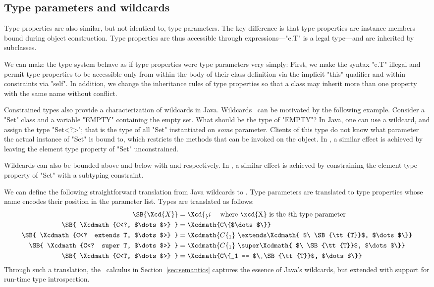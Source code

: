 \subsection{Type parameters and wildcards}
\label{sec:parameters-vs-fields}

Type properties are also similar, but not identical to, type
parameters.  The key difference is that type properties are
instance members bound during object construction.  Type
properties are thus accessible through expressions---\xcd"e.T" is
a legal type---and are inherited by subclasses.

We can make the type system behave as if type properties were
type parameters very simply:  First, we make the syntax \xcd"e.T"
illegal and permit type properties to be accessible only
from within the body of their class definition via the implicit \xcd"this"
qualifier and within constraints via \xcd"self".  In addition,
we change the inheritance rules of type properties so that a
class may inherit more than one property with the same name
without conflict.

Constrained types also provide a characterization of
wildcards in Java.
Wildcards~\cite{Java3,adding-wildcards} can be motivated
by the following example.
Consider a \xcd"Set" class and a variable \xcd"EMPTY" containing
the empty set.  What should be the type of \xcd"EMPTY"?
In Java, one can use a wildcard, and 
assign the type \xcd"Set<?>"; that is the type of all \xcd"Set"
instantiated on \emph{some} parameter.  Clients of this
type do not know what parameter the actual instance of \xcd"Set"
is bound to, which restricts the methods that can be invoked on
the object.
In \Xten{}, a similar effect is achieved by leaving the
element type property of \xcd"Set" unconstrained.

Wildcards can
also be bounded above and below with
   and    respectively.
%
In \Xten{}, a similar effect is achieved by constraining
the
element type property of \xcd"Set" with a subtyping constraint.

We can define the following straightforward translation
from Java wildcards to \Xten{}.
Type parameters are translated to type properties whose name
encodes their position in the parameter list.
Types are translated as follows:
{\footnotesize
\begin{align*}
\SB{ \Xcd{X} } &= \Xcd{_}i ~~~~\mbox{where \xcd{X} is the $i$th type parameter} \\
\SB{ \Xcdmath{C<?, $\dots$>} } &= \Xcdmath{C\{$\dots$\}} \\
\SB{ \Xcdmath{C<? extends T, $\dots$>} } &= \Xcdmath{C\{_1 } \ \extends\Xcdmath{ $\ \SB{\tt{T}}$, $\dots$\}} \\
\SB{ \Xcdmath{C<? super T, $\dots$>} } &= \Xcdmath{C\{_1 } \ \super\Xcdmath{ $\ \SB{\tt{T}}$, $\dots$\}} \\
\SB{ \Xcdmath{C<T, $\dots$>} } &= \Xcdmath{C\{_1 == $\ \SB{\tt{T}}$, $\dots$\}}
\end{align*}}
Through such a translation, the \FXG\ calculus in
Section~\ref{sec:semantics} captures the essence of Java's
wildcards, but extended with support for run-time type
introspection.

